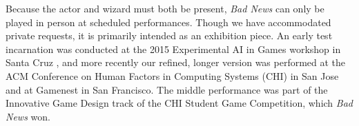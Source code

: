 \documentclass[letterpaper]{article}
\begin{document}
Because the actor and wizard must both be present, \textit{Bad News} can only be played in person at scheduled performances. Though we have accommodated private requests, it is primarily intended as an exhibition piece. An early test incarnation was conducted at the 2015 Experimental AI in Games workshop in Santa Cruz \cite{ryan2015bad}, and more recently our refined, longer version was performed at the ACM Conference on Human Factors in Computing Systems (CHI) in San Jose \cite{ryan2016bad} and at Gamenest in San Francisco. The middle performance was part of the Innovative Game Design track of the CHI Student Game Competition, which \textit{Bad News} won.









\end{document}
